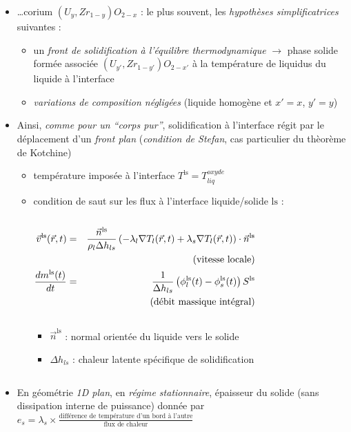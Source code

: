 \begin{frame}[fragile]
\begin{itemize}
\item \dots corium $\left(U_y,Zr_{1-y}\right)O_{2-x}$ : le plus souvent, les \emph{hypothèses simplificatrices} suivantes :
\begin{itemize}
  \item un \emph{front de solidification à l'équilibre thermodynamique} $\rightarrow$ phase solide formée associée $\left(U_{y'},Zr_{1-y'}\right)O_{2-x'}$ à la température de liquidus du liquide à l'interface 
  \item \emph{variations de composition négligées} (liquide homogène et $x'=x$, $y'=y$)
\end{itemize}
\item Ainsi, \emph{comme pour un ``corps pur''}, solidification à l'interface régit par le déplacement d'un \emph{front plan} (\emph{condition de Stefan}, cas particulier du thèorème de Kotchine)
\begin{itemize}
  \item température imposée à l'interface $T^{\textrm{ls}}=T_{liq}^{oxyde}$
  \item condition de saut sur les flux à l'interface liquide/solide $\textrm{ls}$ : 
\begin{columns}
\begin{scriptsize}
\begin{column}{0.55\textwidth}
\begin{eqnarray*}
  \vec{v}^{\textrm{ls}}(\vec{r}, t) &=& \frac{\vec{n}^{\textrm{ls}}}{\rho_l \Delta h_{ls}} \left(-\lambda_l \nabla T_l(\vec{r}, t) + \lambda_s \nabla T_l(\vec{r}, t) \right) \cdot \vec{n}^{\textrm{ls}} \\
  &&\text{(vitesse locale)}\\
  \frac{dm^{\textrm{ls}}(t)}{dt} &=& \frac{1}{\Delta h_{ls}} \left(\phi_l^{\textrm{ls}}(t) - \phi_s^{\textrm{ls}}(t)\right) S^{\textrm{ls}} \\
  && \text{(débit massique intégral)}
\end{eqnarray*}
\end{column}
\begin{column}{0.45\textwidth}
\begin{itemize}
\item $\vec{n}^{\textrm{ls}}$ : normal orientée du liquide vers le solide
\item $\Delta h_{ls}$ : chaleur latente spécifique de solidification
\end{itemize}
\end{column}
\end{scriptsize}
\end{columns}
\end{itemize}
\item En géométrie \emph{1D plan}, en  \emph{régime stationnaire}, épaisseur du solide (sans dissipation interne de puissance) donnée par \emph{$e_{s} = \lambda_{s}\times \frac{\text{différence de température d'un bord à l'autre}}{\text{flux de chaleur}}$}
\end{itemize}
\end{frame}
